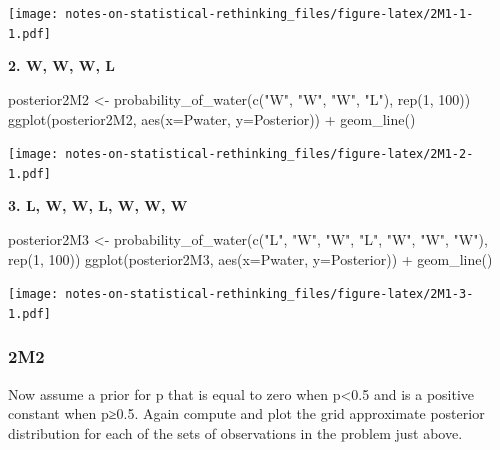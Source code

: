 \documentclass[
]{book}
\newenvironment{Shaded}{\begin{snugshade}}{\end{snugshade}}
\newcommand{\AttributeTok}[1]{\textcolor[rgb]{0.77,0.63,0.00}{#1}}
\newcommand{\DecValTok}[1]{\textcolor[rgb]{0.00,0.00,0.81}{#1}}
\newcommand{\FunctionTok}[1]{\textcolor[rgb]{0.00,0.00,0.00}{#1}}
\newcommand{\NormalTok}[1]{#1}
\newcommand{\OtherTok}[1]{\textcolor[rgb]{0.56,0.35,0.01}{#1}}
\newcommand{\SpecialCharTok}[1]{\textcolor[rgb]{0.00,0.00,0.00}{#1}}
\newcommand{\StringTok}[1]{\textcolor[rgb]{0.31,0.60,0.02}{#1}}
\begin{document}
\texttt{[image: notes-on-statistical-rethinking\_files/figure-latex/2M1-1-1.pdf]}

\textbf{2. W, W, W, L}

\begin{Shaded}
\begin{Highlighting}[]
\NormalTok{posterior2M2 }\OtherTok{\textless{}{-}} \FunctionTok{probability\_of\_water}\NormalTok{(}\FunctionTok{c}\NormalTok{(}\StringTok{"W"}\NormalTok{, }\StringTok{"W"}\NormalTok{, }\StringTok{"W"}\NormalTok{, }\StringTok{"L"}\NormalTok{), }\FunctionTok{rep}\NormalTok{(}\DecValTok{1}\NormalTok{, }\DecValTok{100}\NormalTok{))}
\FunctionTok{ggplot}\NormalTok{(posterior2M2, }\FunctionTok{aes}\NormalTok{(}\AttributeTok{x=}\NormalTok{Pwater, }\AttributeTok{y=}\NormalTok{Posterior)) }\SpecialCharTok{+} 
  \FunctionTok{geom\_line}\NormalTok{()}
\end{Highlighting}
\end{Shaded}

\texttt{[image: notes-on-statistical-rethinking\_files/figure-latex/2M1-2-1.pdf]}

\textbf{3. L, W, W, L, W, W, W}

\begin{Shaded}
\begin{Highlighting}[]
\NormalTok{posterior2M3 }\OtherTok{\textless{}{-}} \FunctionTok{probability\_of\_water}\NormalTok{(}\FunctionTok{c}\NormalTok{(}\StringTok{"L"}\NormalTok{, }\StringTok{"W"}\NormalTok{, }\StringTok{"W"}\NormalTok{, }\StringTok{"L"}\NormalTok{, }\StringTok{"W"}\NormalTok{, }\StringTok{"W"}\NormalTok{, }\StringTok{"W"}\NormalTok{), }\FunctionTok{rep}\NormalTok{(}\DecValTok{1}\NormalTok{, }\DecValTok{100}\NormalTok{))}
\FunctionTok{ggplot}\NormalTok{(posterior2M3, }\FunctionTok{aes}\NormalTok{(}\AttributeTok{x=}\NormalTok{Pwater, }\AttributeTok{y=}\NormalTok{Posterior)) }\SpecialCharTok{+} 
  \FunctionTok{geom\_line}\NormalTok{()}
\end{Highlighting}
\end{Shaded}

\texttt{[image: notes-on-statistical-rethinking\_files/figure-latex/2M1-3-1.pdf]}

\hypertarget{m2}{%
\subsubsection*{2M2}\label{m2}}

Now assume a prior for p that is equal to zero when p\textless0.5 and is a positive constant when p≥0.5. Again compute and plot the grid approximate posterior distribution for each of the sets of observations in the problem just above.
\end{document}
